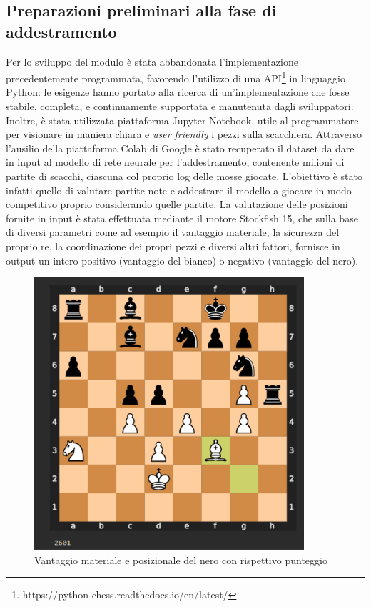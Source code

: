 \subsection{Preparazioni preliminari alla fase di addestramento}
Per lo sviluppo del modulo è stata abbandonata l'implementazione precedentemente programmata, favorendo l'utilizzo di una API\footnote{https://python-chess.readthedocs.io/en/latest/} in linguaggio Python: le esigenze hanno portato alla ricerca di un'implementazione che fosse stabile, completa, e continuamente supportata e manutenuta dagli sviluppatori. Inoltre, è stata utilizzata piattaforma Jupyter Notebook, utile al programmatore per visionare in maniera chiara e \textit{user friendly} i pezzi sulla scacchiera. Attraverso l'ausilio della piattaforma Colab di Google è stato recuperato il dataset da dare in input al modello di rete neurale per l'addestramento, contenente milioni di partite di scacchi, ciascuna col proprio log delle mosse giocate. L'obiettivo è stato infatti quello di valutare partite note e addestrare il modello a giocare in modo competitivo proprio considerando quelle partite. La valutazione delle posizioni fornite in input è stata effettuata mediante il motore Stockfish 15, che sulla base di diversi parametri come ad esempio il vantaggio materiale, la sicurezza del proprio re, la coordinazione dei propri pezzi e diversi altri fattori, fornisce in output un intero positivo (vantaggio del bianco) o negativo (vantaggio del nero).\newpage

\begin{figure}[!htb]
    \includegraphics[width=10cm]{frontmatter/figure/valutazione_scacchiera.pdf}
    \centering
    \caption{Vantaggio materiale e posizionale del nero con rispettivo punteggio}
    \label{fig:valutazione_scacchiera}
\end{figure}

